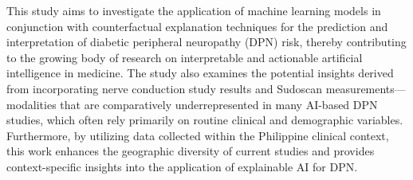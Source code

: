 \documentclass[fleqn,10pt]{wlscirep}
\begin{document}
This study aims to investigate the application of machine learning models in conjunction with counterfactual explanation techniques for the prediction and interpretation of diabetic peripheral neuropathy (DPN) risk, thereby contributing to the growing body of research on interpretable and actionable artificial intelligence in medicine. The study also examines the potential insights derived from incorporating nerve conduction study results and Sudoscan measurements—modalities that are comparatively underrepresented in many AI-based DPN studies, which often rely primarily on routine clinical and demographic variables. Furthermore, by utilizing data collected within the Philippine clinical context, this work enhances the geographic diversity of current studies and provides context-specific insights into the application of explainable AI for DPN.


\end{document}
